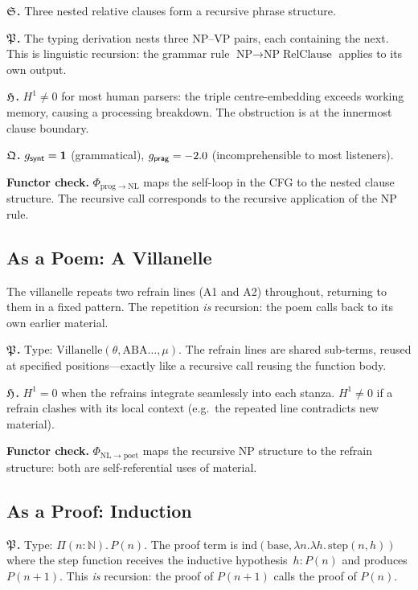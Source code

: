 \textbf{$\mathfrak{S}$.}\quad
Three nested relative clauses form a recursive phrase structure.

\textbf{$\mathfrak{P}$.}\quad
The typing derivation nests three NP--VP pairs, each containing
the next.  This is linguistic recursion: the grammar rule
$\text{NP}\to\text{NP}\;\text{RelClause}$ applies to its own
output.

\textbf{$\mathfrak{H}$.}\quad
$H^1\neq 0$ for most human parsers: the triple centre-embedding
exceeds working memory, causing a processing breakdown.  The
obstruction is at the innermost clause boundary.

\textbf{$\mathfrak{Q}$.}\quad
$g_{\mathsf{synt}}=\mathbf{1}$ (grammatical), $g_{\mathsf{prag}}=-2.0$
(incomprehensible to most listeners).

\textbf{Functor check.}\quad
$\Phi_{\mathrm{prog}\to\mathrm{NL}}$ maps the self-loop in
the CFG to the nested clause structure.  The recursive call
corresponds to the recursive application of the NP rule.

\subsection{As a Poem: A Villanelle}

The villanelle repeats two refrain lines (A1 and A2)
throughout, returning to them in a fixed pattern.  The
repetition \emph{is} recursion: the poem calls back to
its own earlier material.

\textbf{$\mathfrak{P}$.}\quad
Type: $\mathrm{Villanelle}(\theta,\text{ABA}\ldots,\mu)$.
The refrain lines are shared sub-terms, reused at specified
positions---exactly like a recursive call reusing the
function body.

\textbf{$\mathfrak{H}$.}\quad
$H^1=0$ when the refrains integrate seamlessly into each
stanza.  $H^1\neq 0$ if a refrain clashes with its local
context (e.g.\ the repeated line contradicts new material).

\textbf{Functor check.}\quad
$\Phi_{\mathrm{NL}\to\mathrm{poet}}$ maps the recursive NP
structure to the refrain structure: both are self-referential
uses of material.

\subsection{As a Proof: Induction}

\textbf{$\mathfrak{P}$.}\quad
Type: $\Pi(n:\mathbb{N}).\,P(n)$.  The proof term is
$\mathrm{ind}(\mathrm{base},\lambda n.\lambda h.\,
\mathrm{step}(n,h))$ where the step function receives
the inductive hypothesis~$h:P(n)$ and produces $P(n+1)$.
This \emph{is} recursion: the proof of $P(n+1)$ calls
the proof of $P(n)$.

